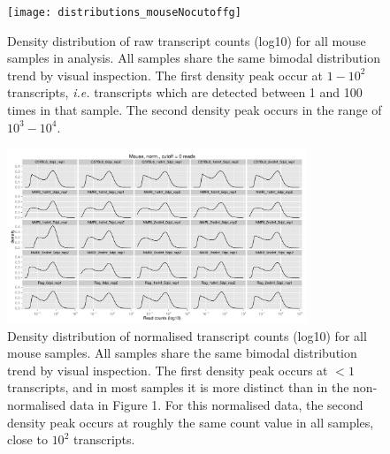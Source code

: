\documentclass{article}
\begin{document}
\begin{figure}[h]
\begin{center}
  \texttt{[image: distributions\_mouseNocutoffg]} 
  \caption{Density distribution of raw transcript counts (log10) for
    all mouse samples in analysis. All samples share the same bimodal
    distribution trend by visual inspection. The first density peak
    occur at $1 - 10^2$ transcripts, \textit{i.e.} transcripts which
    are detected between 1 and 100 times in that sample. The second
    density peak occurs in the range of $10^3 - 10^4$.}
\end{center}
\end{figure}

\begin{figure}[h]
\begin{center}
\includegraphics[width=0.8\textwidth]{distributions_normmouseNocutoff} 
\caption{Density distribution of normalised transcript counts (log10)
  for all mouse samples. All samples share the same bimodal
  distribution trend by visual inspection. The first density peak
  occurs at $<1$ transcripts, and in most samples it is more distinct
  than in the non-normalised data in Figure 1. For this normalised
  data, the second density peak occurs at roughly the same count value
  in all samples, close to $10^2$ transcripts.}
\end{center}
\end{figure}
\end{document}

